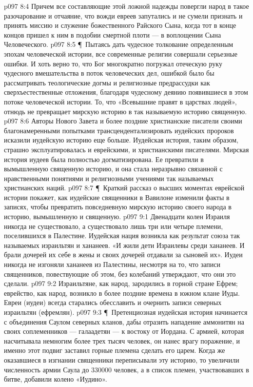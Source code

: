 \vs p097 8:4 Причем все составляющие этой ложной надежды повергли народ в такое разочарование и отчаяние, что вожди евреев запутались и не сумели признать и принять миссию и служение божественного Райского Сына, когда тот в конце концов пришел к ним в подобии смертной плоти --- в воплощении Сына Человеческого.
\vs p097 8:5 \P\ Пытаясь дать чудесное толкование определенным эпохам человеческой истории, все современные религии совершали серьезные ошибки. И хоть верно то, что Бог многократно погружал отеческую руку чудесного вмешательства в поток человеческих дел, ошибкой было бы рассматривать теологические догмы и религиозные предрассудки как сверхъестественные отложения, благодаря чудесному деянию появившиеся в этом потоке человеческой истории. То, что «Всевышние правят в царствах людей», отнюдь не превращает мирскую историю в так называемую историю священную.
\vs p097 8:6 Авторы Нового Завета и более поздние христианские писатели своими благонамеренными попытками трансцендентализировать иудейских пророков исказили иудейскую историю еще больше. Иудейская история, таким образом, страшно эксплуатировалась и еврейскими, и христианскими писателями. Мирская история иудеев была полностью догматизирована. Ее превратили в вымышленную священную историю, и она стала неразрывно связанной с нравственными понятиями и религиозными учениями так называемых христианских наций.
\vs p097 8:7 \P\ Краткий рассказ о высших моментах еврейской истории покажет, как иудейские священники в Вавилоне изменили факты в записях, чтобы превратить повседневную мирскую историю своего народа в историю, вымышленную и священную.
\vs p097 9:1 Двенадцати колен Израиля никогда не существовало, а существовало лишь три или четыре племени, поселившихся в Палестине. Иудейская нация возникла как результат союза так называемых израильтян и хананеев. «И жили дети Израилевы среди хананеев. И брали дочерей их себе в жены и своих дочерей отдавали за сыновей их». Иудеи никогда не изгоняли хананеев из Палестины, несмотря на то, что записи священников, повествующие об этом, без колебаний утверждают, что они это сделали.
\vs p097 9:2 Израильтяне, как народ, зародились в горной стране Ефрем; еврейство, как народ, возникло в более поздние времена в южном клане Иуды. Евреи (иудеи) всегда старались обесславить и очернить записи северных израильтян (ефремлян).
\vs p097 9:3 \P\ Претенциозная иудейская история начинается с объединения Саулом северных кланов, дабы отразить нападение аммонитян на своих соплеменников --- галаадетян --- к востоку от Иордана. С армией, которая насчитывала немногим более трех тысяч человек, он нанес врагу поражение, и именно этот подвиг заставил горные племена сделать его царем. Когда же оказавшиеся в изгнании священники переписывали эту историю, то увеличили численность армии Саула до 330000 человек, а в список племен, участвовавших в битве, добавили колено «Иудино».
